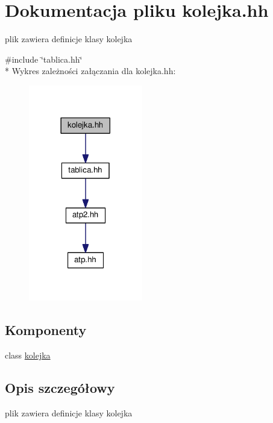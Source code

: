 \hypertarget{kolejka_8hh}{}\section{Dokumentacja pliku kolejka.\+hh}
\label{kolejka_8hh}


plik zawiera definicje klasy kolejka  


{\ttfamily \#include \char`\"{}tablica.\+hh\char`\"{}}\\*
Wykres zależności załączania dla kolejka.\+hh\+:\nopagebreak
\begin{figure}[H]
\begin{center}
\leavevmode
\includegraphics[width=141pt]{kolejka_8hh__incl}
\end{center}
\end{figure}
\subsection*{Komponenty}
\begin{DoxyCompactItemize}
\item 
class \hyperlink{classkolejka}{kolejka}
\end{DoxyCompactItemize}


\subsection{Opis szczegółowy}
plik zawiera definicje klasy kolejka 

